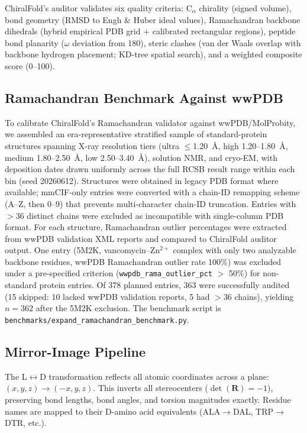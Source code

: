 \documentclass[11pt]{article}
\begin{document}
ChiralFold's auditor validates six quality criteria: C$_\alpha$ chirality (signed volume), bond geometry (RMSD to Engh \& Huber ideal values), Ramachandran backbone dihedrals (hybrid empirical PDB grid + calibrated rectangular regions), peptide bond planarity ($\omega$ deviation from 180\textdegree), steric clashes (van der Waals overlap with backbone hydrogen placement; KD-tree spatial search), and a weighted composite score (0--100).

\subsection{Ramachandran Benchmark Against wwPDB}

To calibrate ChiralFold's Ramachandran validator against wwPDB/MolProbity, we assembled an era-representative stratified sample of standard-protein structures spanning X-ray resolution tiers (ultra $\leq$1.20~\AA, high 1.20--1.80~\AA, medium 1.80--2.50~\AA, low 2.50--3.40~\AA), solution NMR, and cryo-EM, with deposition dates drawn uniformly across the full RCSB result range within each bin (seed 20260612). Structures were obtained in legacy PDB format where available; mmCIF-only entries were converted with a chain-ID remapping scheme (A--Z, then 0--9) that prevents multi-character chain-ID truncation. Entries with $>$36 distinct chains were excluded as incompatible with single-column PDB format. For each structure, Ramachandran outlier percentages were extracted from wwPDB validation XML reports and compared to ChiralFold auditor output. One entry (5M2K, vancomycin--Zn$^{2+}$ complex with only two analyzable backbone residues, wwPDB Ramachandran outlier rate 100\%) was excluded under a pre-specified criterion (\texttt{wwpdb\_rama\_outlier\_pct} $>$ 50\%) for non-standard protein entries. Of 378 planned entries, 363 were successfully audited (15 skipped: 10 lacked wwPDB validation reports, 5 had $>$36 chains), yielding $n=362$ after the 5M2K exclusion. The benchmark script is \texttt{benchmarks/expand\_ramachandran\_benchmark.py}.

\subsection{Mirror-Image Pipeline}

The L$\leftrightarrow$D transformation reflects all atomic coordinates across a plane: $(x,y,z) \to (-x,y,z)$. This inverts all stereocenters ($\det(\mathbf{R}) = -1$), preserving bond lengths, bond angles, and torsion magnitudes exactly. Residue names are mapped to their D-amino acid equivalents (ALA$\to$DAL, TRP$\to$DTR, etc.).
\end{document}
